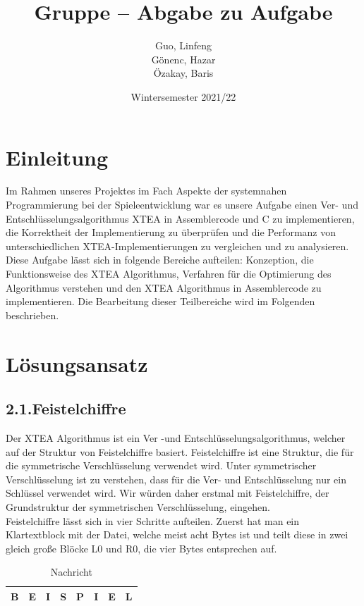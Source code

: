 \documentclass[course=asp]{aspdoc}
\author{Guo, Linfeng\\Gönenc, Hazar \\Özakay, Baris}
\date{Wintersemester 2021/22}
\title{Gruppe \theGroup{} -- Abgabe zu Aufgabe \theNumber}
\begin{document}
\maketitle



\section{Einleitung}
Im Rahmen unseres Projektes im Fach Aspekte der systemnahen Programmierung bei der Spieleentwicklung war es unsere Aufgabe einen Ver- und Entschlüsselungsalgorithmus XTEA in Assemblercode und C zu implementieren, die Korrektheit der Implementierung zu überprüfen und die Performanz von unterschiedlichen XTEA-Implementierungen zu vergleichen und zu analysieren. Diese Aufgabe lässt sich in folgende Bereiche aufteilen: Konzeption, die Funktionsweise des XTEA Algorithmus, Verfahren für die Optimierung des Algorithmus verstehen und den XTEA Algorithmus in Assemblercode zu implementieren. Die Bearbeitung dieser Teilbereiche wird im Folgenden beschrieben.  \\

\newpage
\section{Lösungsansatz}
\subsection*{2.1.Feistelchiffre }
Der XTEA Algorithmus ist ein Ver -und Entschlüsselungsalgorithmus, welcher auf der Struktur von Feistelchiffre basiert. Feistelchiffre ist eine Struktur, die für die symmetrische Verschlüsselung verwendet wird. Unter symmetrischer Verschlüsselung ist zu verstehen, dass für die Ver- und Entschlüsselung nur ein Schlüssel verwendet wird. Wir würden daher erstmal mit Feistelchiffre, der Grundstruktur der symmetrischen Verschlüsselung, eingehen.\\
Feistelchiffre lässt sich in vier Schritte aufteilen. Zuerst hat man ein Klartextblock mit der Datei, welche meist acht Bytes ist und teilt diese in zwei gleich große Bl\"ocke L0 und R0, die vier Bytes entsprechen auf.

\begin{table}[H]
\centering
    \begin{tabular}{|l|l|l|l|l|l|l|l|}
        \hline
        B & E & I & S & P & I & E & L   \\
        \hline
    \end{tabular}
    \caption{Nachricht}
\end{table}
\end{document}
